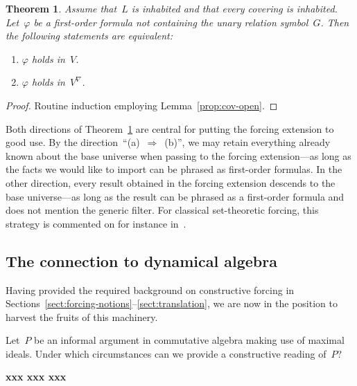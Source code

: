 \documentclass[com,11pt,crcready]{iosart2x}
\theoremstyle{definition}
\theoremstyle{plain}
\newtheorem{theorem}[definition]{Theorem}
\theoremstyle{remark}
\newcommand{\?}{\,{:}\,}
\renewcommand{\_}{\mathpunct{.}\,}
\begin{document}
\begin{theorem}\label{thm:backforth}Assume that~$L$ is inhabited and that every
covering is inhabited. Let~$\varphi$ be a first-order formula not containing
the unary relation symbol~$G$. Then the following statements are equivalent:
\begin{enumerate}
\item[(a)] $\varphi$ holds in~$V$.
\item[(b)] $\varphi$ holds in~$V^\nabla$.
\end{enumerate}
\end{theorem}

\begin{proof}Routine induction employing Lemma~\ref{prop:cov-open}.
\end{proof}

Both directions of Theorem~\ref{thm:backforth} are central for putting the
forcing extension to good use. By the direction~``(a)~$\Rightarrow$~(b)'',
we may retain everything already known about the base universe when passing to
the forcing extension---as long as the facts we would like to import can be
phrased as first-order formulas. In the other direction, every result obtained
in the forcing extension descends to the base universe---as long as the result
can be phrased as a first-order formula and does not mention the generic
filter. For classical set-theoretic forcing, this strategy is commented on for
instance in~\cite[Theorem~2]{hamkins:multiverse}.


\subsection{The connection to dynamical algebra}

Having provided the required background on constructive forcing in
Sections~\ref{sect:forcing-notions}--\ref{sect:translation}, we are now in the
position to harvest the fruits of this machinery.

Let~$P$ be an informal argument in commutative algebra making use of maximal
ideals. Under which circumstances can we provide a constructive reading of~$P$?

\textbf{xxx xxx xxx}
\end{document}
